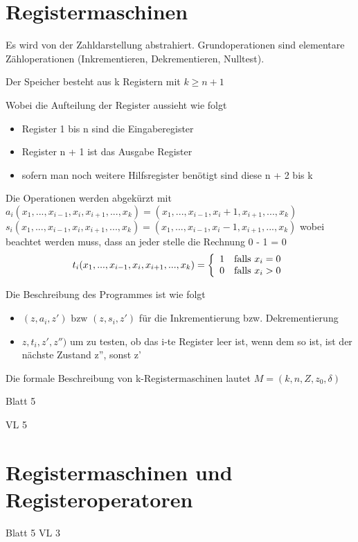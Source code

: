 \documentclass[12pt,a4paper]{article} %
\begin{document}
	\section{Registermaschinen}
	Es wird von der Zahldarstellung abstrahiert.
	Grundoperationen sind elementare Zähloperationen (Inkrementieren, Dekrementieren, Nulltest).
	
	Der Speicher besteht aus k Registern mit $k \ge n + 1$ 
	
	Wobei die Aufteilung der Register aussieht wie folgt 
	
	\begin{itemize}
		\item Register 1 bis n sind die Eingaberegister
		\item Register n + 1 ist das Ausgabe Register
		\item sofern man noch weitere Hilfsregister benötigt sind diese n + 2 bis k
	\end{itemize}
	
	Die Operationen werden abgekürzt mit \newline 
	$a_i(x_1, ..., x_{i - 1}, x_i, x_{i + 1}, ..., x_k) = (x_1, ..., x_{i - 1}, x_i + 1, x_{i + 1}, ..., x_k)$ \newline
	$s_i(x_1, ..., x_{i - 1}, x_i, x_{i + 1}, ..., x_k) = (x_1, ..., x_{i - 1}, x_i - 1, x_{i + 1}, ..., x_k)$ wobei beachtet werden muss, dass an jeder stelle die Rechnung 0 - 1 = 0 \newline 
	\[t_i(x_1, ..., x_{i - 1}, x_i, x_{i + 1}, ..., x_k) = \left\{ 
		\begin{array}{l l}
			1 & \text{falls } x_i = 0 \\
			0 & \text{falls } x_i > 0
		\end{array}
	\right.\]
	
	Die Beschreibung des Programmes ist wie folgt
	
	\begin{itemize}
		\item $(z, a_i, z') \text{ bzw } (z, s_i, z')$ für die Inkrementierung bzw. Dekrementierung
		\item $z, t_i, z', z'')$ um zu testen, ob das i-te Register leer ist, wenn dem so ist, ist der nächste Zustand z'', sonst z'
	\end{itemize}
	
	Die formale Beschreibung von k-Registermaschinen lautet $M = (k, n, Z, z_0, \delta)$
	
	Blatt 5
	
	VL 5
	
	\section{Registermaschinen und Registeroperatoren}
	Blatt 5
	VL 3
	
\end{document}

